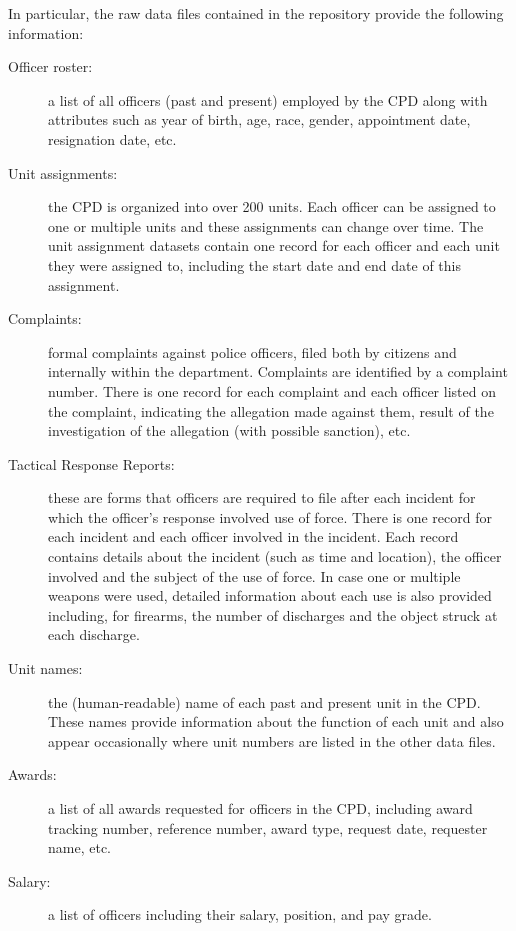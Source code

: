 In particular, the raw data files contained in the repository
provide the following information:
\begin{description}
	\item[Officer roster:] a list of all officers (past and present) employed
		by the CPD along with attributes such as year of birth, age, race,
		gender, appointment date, resignation date, etc.
	\item[Unit assignments:] the CPD is organized into over 200 units.
		Each officer can be assigned to one or multiple units and these
		assignments can change over time. The unit assignment datasets contain
		one record for each officer and each unit they were assigned to, including
		the start date and end date of this assignment.
	\item[Complaints:] formal complaints against police officers, filed both by
		citizens and internally within the department. Complaints are
		identified by a complaint number. There is one record for each
		complaint and each officer listed on the complaint, indicating the
		allegation made against them, result of the investigation of the
		allegation (with possible sanction), etc.
	\item[Tactical Response Reports:] these are forms that officers are
		required to file after each incident for which the officer's response
		involved use of force. There is one record for each incident and each
		officer involved in the incident. Each record contains details about
		the incident (such as time and location), the officer involved and the
		subject of the use of force. In case one or multiple weapons were used,
		detailed information about each use is also provided including, for
		firearms, the number of discharges and the object struck at each
		discharge.
	\item[Unit names:] the (human-readable) name of each past and present
		unit in the CPD. These names provide information about the function of
		each unit and also appear occasionally where unit numbers are listed in
		the other data files.
	\item[Awards:] a list of all awards requested for officers in the CPD,
		including award tracking number, reference number, award type, request
		date, requester name, etc.
	\item[Salary:] a list of officers including their salary, position, and pay grade.
\end{description}

